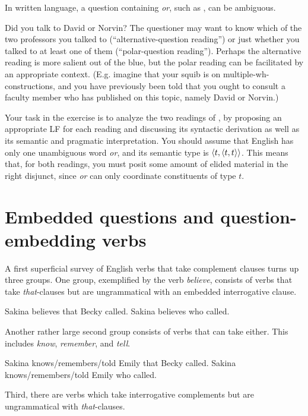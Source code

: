 \begin{exercise}
  In written language, a question containing \emph{or}, such as \Next, can be
  ambiguous.

  \ex Did you talk to David or Norvin?\xe
%
  The questioner may want to know which of the two professors you talked to
  (``alternative-question reading'') or just whether you talked to at least one
  of them (``polar-question reading''). Perhaps the alternative reading is more
  salient out of the blue, but the polar reading can be facilitated by an
  appropriate context. (E.g. imagine that your squib is on
  multiple-wh-constructions, and you have previously been told that you ought to
  consult a faculty member who has published on this topic, namely David or
  Norvin.)

  Your task in the exercise is to analyze the two readings of \Last, by
  proposing an appropriate LF for each reading and discussing its syntactic
  derivation as well as its semantic and pragmatic interpretation. You should
  assume that English has only one unambiguous word \emph{or}, and its semantic
  type is $\langle t,\langle t,t \rangle \rangle$. This means that, for both readings, you must
  posit some amount of elided material in the right disjunct, since \emph{or}
  can only coordinate constituents of type $t$.
\end{exercise}

\section{Embedded questions and question-embedding verbs}
\label{sec:embedded-questions}

A first superficial survey of English verbs that take complement clauses turns
up three groups. %
%
One group, exemplified by the verb \emph{believe}, consists of verbs that take
\emph{that}-clauses but are ungrammatical with an embedded interrogative clause.

\pex
\a Sakina believes that Becky called.
\a *Sakina believes who called.
\xe

Another rather large second group consists of verbs that can take either. This
includes \emph{know}, \emph{remember}, and \emph{tell}.

\pex
\a Sakina knows/remembers/told Emily that Becky called.
\a Sakina knows/remembers/told Emily who called.\label{ex:know-Q}
\xe

Third, there are verbs which take interrogative complements but are
ungrammatical with \emph{that}-clauses.

